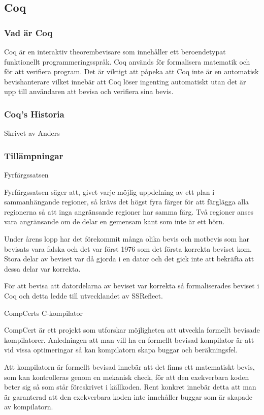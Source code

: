 \subsection{Coq}
\subsubsection{Vad är Coq}
Coq är en interaktiv theorembevisare som innehåller ett beroendetypat
funktionellt programmeringsspråk. Coq används för formalisera matematik och för
att verifiera program. Det är viktigt att påpeka att Coq inte är en automatisk
bevishanterare vilket innebär att Coq löser ingenting automatiskt utan det är
upp till användaren att bevisa och verifiera sina bevis.

\subsubsection{Coq's Historia}
Skrivet av Anders

\subsubsection{Tillämpningar}

{\underline \large Fyrfärgssatsen}

Fyrfärgssatsen\autocite{gonthier2008formal} säger att, givet varje möjlig
uppdelning av ett plan i sammanhängande regioner, så krävs det högst fyra
färger för att färglägga alla regionerna så att inga angränsande regioner
har samma färg. Två regioner anses vara angränsande om de delar en
gemensam kant som inte är ett hörn.

Under årens lopp har det förekommit många olika bevis och motbevis som har
bevisats vara falska och  det var först 1976 som det första korrekta beviset
kom. Stora delar av beviset var då gjorda i en dator och det gick inte att
bekräfta att dessa delar var korrekta.

För att bevisa att datordelarna av beviset var korrekta så formaliserades
beviset i Coq och detta ledde till utvecklandet av SSReflect.

{\underline \large CompCerts C-kompilator}

CompCert\autocite{compcert} är ett projekt som utforskar möjligheten att
utveckla formellt bevisade kompilatorer. Anledningen att man vill ha en
formellt bevisad kompilator är att vid vissa optimeringar så kan kompilatorn
skapa buggar och beräkningsfel.

Att kompilatorn är formellt bevisad innebär att det finns ett matematiskt
bevis, som kan kontrolleras genom en mekanisk check, för att den exekverbara
koden beter sig så som står föreskrivet i källkoden. Rent konkret innebär detta
att man är garanterad att den exekverbara koden inte innehåller buggar som är
skapade av kompilatorn.

